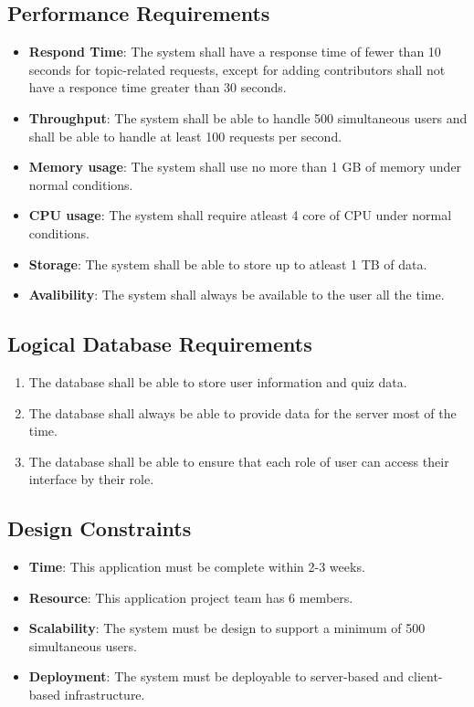 \documentclass[ 10pt]{report}
\begin{document}
        \subsection{Performance Requirements}
        \begin{itemize}
        \item \textbf{Respond Time}: The system shall have a response time of fewer than 10 seconds for topic-related requests, except for adding contributors shall not have a responce time greater than 30 seconds.  
        \item \textbf{Throughput}: The system shall be able to handle 500 simultaneous users and shall be able to handle at least 100 requests per second.
        \item \textbf{Memory usage}: The system shall use no more than 1 GB of memory under normal conditions. 
        \item \textbf{CPU usage}: The system shall require atleast 4 core of CPU under normal conditions.
        \item \textbf{Storage}: The system shall be able to store up to atleast 1 TB of data.
        \item \textbf{Avalibility}: The system shall always be available to the user all the time.
        \end{itemize}
        \subsection{Logical Database Requirements}
        \begin{enumerate}
            \item The database shall be able to store user information and quiz data.
            \item The database shall always be able to provide data for the server most of the time.
            \item The database shall be able to ensure that each role of user can access their interface by their role.
        \end{enumerate}
        \subsection{Design Constraints}
        \begin{itemize}
        \item \textbf{Time}: This application must be complete within 2-3 weeks.
        \item \textbf{Resource}: This application project team has 6 members.
        \item \textbf{Scalability}: The system must be design to support a minimum of 500 simultaneous users.
        \item \textbf{Deployment}: The system must be deployable to server-based and client-based infrastructure.
        \end{itemize}
\end{document}
